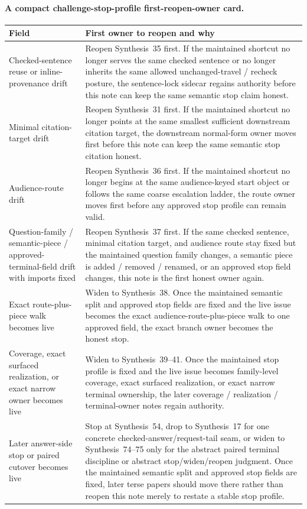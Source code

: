 \documentclass[11pt]{article}
\begin{document}
\paragraph{A compact challenge-stop-profile first-reopen-owner card.}
\begin{table}[t]
\centering
\small
\begin{tabularx}{\linewidth}{@{}lX@{}}
\toprule
Field & First owner to reopen and why \\
\midrule
Checked-sentence reuse or inline-provenance drift & Reopen Synthesis~35 first. If the maintained shortcut no longer serves the same checked sentence or no longer inherits the same allowed unchanged-travel / recheck posture, the sentence-lock sidecar regains authority before this note can keep the same semantic stop claim honest. \\
Minimal citation-target drift & Reopen Synthesis~31 first. If the maintained shortcut no longer points at the same smallest sufficient downstream citation target, the downstream normal-form owner moves first before this note can keep the same semantic stop citation honest. \\
Audience-route drift & Reopen Synthesis~36 first. If the maintained shortcut no longer begins at the same audience-keyed start object or follows the same coarse escalation ladder, the route owner moves first before any approved stop profile can remain valid. \\
Question-family / semantic-piece / approved-terminal-field drift with imports fixed & Reopen Synthesis~37 first. If the same checked sentence, minimal citation target, and audience route stay fixed but the maintained question family changes, a semantic piece is added / removed / renamed, or an approved stop field changes, this note is the first honest owner again. \\
Exact route-plus-piece walk becomes live & Widen to Synthesis~38. Once the maintained semantic split and approved stop fields are fixed and the live issue becomes the exact audience-route-plus-piece walk to one approved field, the exact branch owner becomes the honest stop. \\
Coverage, exact surfaced realization, or exact narrow owner becomes live & Widen to Synthesis~39--41. Once the maintained stop profile is fixed and the live issue becomes family-level coverage, exact surfaced realization, or exact narrow terminal ownership, the later coverage / realization / terminal-owner notes regain authority. \\
Later answer-side stop or paired cutover becomes live & Stop at Synthesis~54, drop to Synthesis~17 for one concrete checked-answer/request-tail seam, or widen to Synthesis~74--75 only for the abstract paired terminal discipline or abstract stop/widen/reopen judgment. Once the maintained semantic split and approved stop fields are fixed, later terse papers should move there rather than reopen this note merely to restate a stable stop profile. \\

\end{tabularx}
\end{table}
\end{document}
